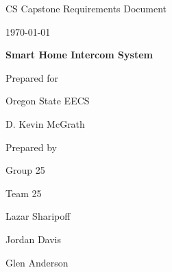 \documentclass[onecolumn, draftclsnofoot,10pt, compsoc]{IEEEtran}
\def \CapstoneTeamName{		Team 25}
\def \CapstoneTeamNumber{		25}
\def \GroupMemberOne{			Lazar Sharipoff}
\def \GroupMemberTwo{			Jordan Davis}
\def \GroupMemberThree{			Glen Anderson}
\def \CapstoneProjectName{		Smart Home Intercom System}
\def \CapstoneSponsorCompany{	Oregon State EECS}
\def \CapstoneSponsorPerson{		D. Kevin McGrath}
\def \DocType{		%
				Requirements Document
				}
\newcommand{\NameSigPair}[1]{\par
\makebox[2.75in][r]{#1} \hfil 	\makebox[3.25in]{\makebox[2.25in]{\hrulefill} \hfill		\makebox[.75in]{\hrulefill}}
\par\vspace{-12pt} \textit{\tiny\noindent
\makebox[2.75in]{} \hfil		\makebox[3.25in]{\makebox[2.25in][r]{Signature} \hfill	\makebox[.75in][r]{Date}}}}
\renewcommand{\NameSigPair}[1]{#1}
\begin{document}
\begin{titlepage}
    \begin{singlespace}
        \hfill 
        \par\vspace{.2in}
        \centering
        \scshape{
            \huge CS Capstone \DocType \par
            {\large\today}\par
            \vspace{.5in}
            \textbf{\Huge\CapstoneProjectName}\par
            \vfill
            {\large Prepared for}\par
            \Huge \CapstoneSponsorCompany\par
            \vspace{5pt}
            {\Large\NameSigPair{\CapstoneSponsorPerson}\par}
            {\large Prepared by }\par
            Group\CapstoneTeamNumber\par
            \CapstoneTeamName\par 
            \vspace{5pt}
            {\Large
                \NameSigPair{\GroupMemberOne}\par
                \NameSigPair{\GroupMemberTwo}\par
                \NameSigPair{\GroupMemberThree}\par
            }
            \vspace{20pt}
        }
        \begin{abstract}
        	This document is written using one sentence per line.
        	This allows you to have sensible diffs when you use \LaTeX with version control, as well as giving a quick visual test to see if sentences are too short/long.
        	If you have questions, ``The Not So Short Guide to LaTeX'' is a great resource (\url{https://tobi.oetiker.ch/lshort/lshort.pdf})
        \end{abstract}     
    \end{singlespace}
\end{titlepage}
\newpage
{}
\tableofcontents
\listoftables
\clearpage
\end{document}

